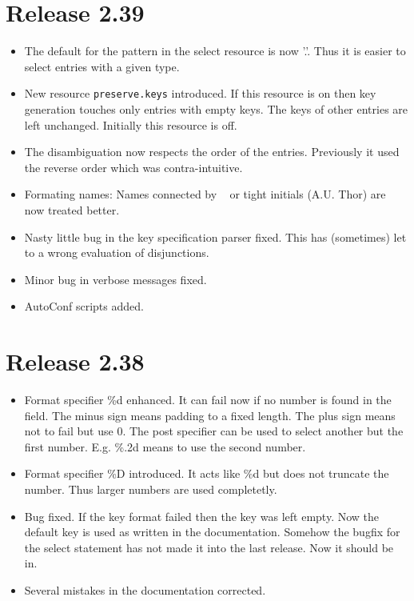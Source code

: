 \documentclass[11pt,a4paper]{scrartcl}
\newcommand\rsc[1]{\texttt{#1}}
\newenvironment{Release}[2]{\section*{Release #1}\begin{itemize}}{\end{itemize}}
\newenvironment{Fix}[1]{\item }{}
\newenvironment{New}[1]{\item }{}
\newenvironment{Doc}[1]{\item }{}
\newenvironment{Update}[1]{\item }{}
\begin{document}
 \begin{Release}{2.39}{}
  \begin{Update}{gene}
    The default for the pattern in the select resource is now '.'.
    Thus it is easier to select entries with a given type.
  \end{Update}
  \begin{New}{gene}
    New resource \rsc{preserve.keys} introduced. If this resource is on
    then key generation touches only entries with empty keys. The keys of
    other entries are left unchanged. Initially this resource is off.
  \end{New}
  \begin{Update}{gene}
    The disambiguation now respects the order of the entries. Previously it
    used the reverse order which was contra-intuitive.
  \end{Update}
  \begin{Update}{gene}
    Formating names: Names connected by ~ or tight initials (A.U. Thor) are
    now treated better.
  \end{Update}
  \begin{Fix}{gene}
    Nasty little bug in the key specification parser fixed. This has
    (sometimes) let to a wrong evaluation of disjunctions.
  \end{Fix}
  \begin{Fix}{gene}
    Minor bug in verbose messages fixed.
  \end{Fix}
  \begin{New}{gene}
    AutoConf scripts added.
  \end{New}
 \end{Release}

 \begin{Release}{2.38}{}
  \begin{New}{gene}
    Format specifier \%d enhanced. It can fail now if no number is found in
    the field. The minus sign means padding to a fixed length. The plus sign
    means not to fail but use 0. The post specifier can be used to select
    another but the first number. E.g. \%.2d means to use the second number.
  \end{New}
  \begin{New}{gene}
    Format specifier \%D introduced. It acts like \%d but does not truncate
    the number. Thus larger numbers are used completetly.
  \end{New}
  \begin{Fix}{gene}
    Bug fixed. If the key format failed then the key was left empty. Now the
    default key is used as written in the documentation. Somehow the bugfix
    for the select statement has not made it into the last release. Now it
    should be in.
  \end{Fix}
  \begin{Doc}{gene}
    Several mistakes in the documentation corrected.
  \end{Doc}
 \end{Release}
\end{document}

